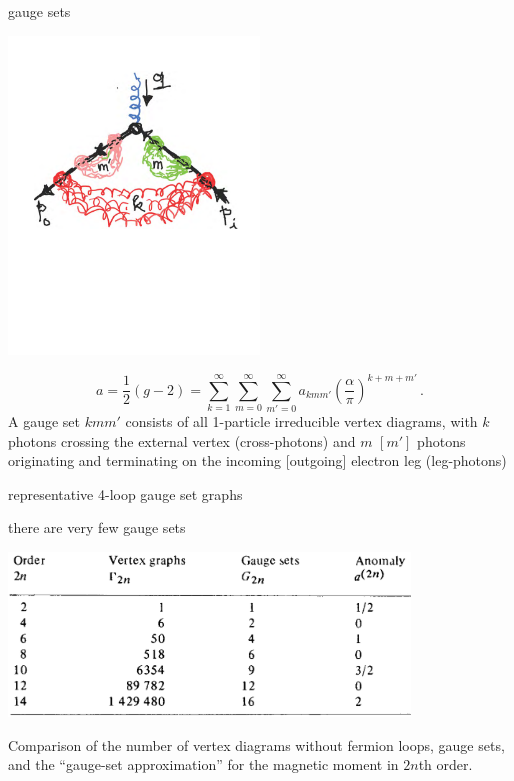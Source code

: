 \begin{frame}{gauge sets}
% 
\begin{center}
\includegraphics[width=0.50\textwidth]{../../figs/gaugeSets}
\end{center}
\[ %
a=\frac{1}{2}(g-2)
       =  \sum_{k=1}^\infty\sum_{m=0}^\infty\sum_{m'=0}^\infty
          a_{kmm'}\left(\frac{\alpha}{\pi}\right)^{k+m+m'}
\,.
\] %
A gauge set $kmm'$ consists of all 1-particle irreducible vertex
diagrams, with $k$ photons crossing the external
vertex (cross-photons) and $m$ $[m']$ photons originating and terminating
on the incoming [outgoing] electron leg (leg-photons)
\end{frame}


\begin{frame}{representative 4-loop gauge set graphs}

\end{frame}

\begin{frame}{there are very few gauge sets}
\begin{center}
\includegraphics[width=0.80\textwidth]{../../figs/Cvit77bTab1}
\end{center}
{\scriptsize  %
Comparison of the number of vertex diagrams without fermion loops, gauge
sets, and the ``gauge-set approximation'' for the magnetic
moment in $2n$th order.
}
\end{frame}

